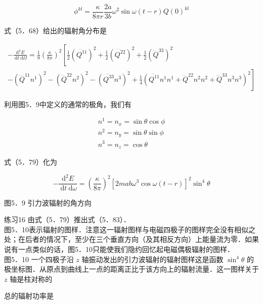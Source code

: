 \begin{equation*}
	\phi^{k l}=\frac{\kappa}{8 \pi r} \frac{2 a}{3 b} \omega^{2} \sin \omega(t-r) Q(0)^{k l} \tag{5.78}
\end{equation*}


式（5．68）给出的辐射角分布是

$$
\begin{gathered}
	-\frac{\mathrm{d}^{2} E}{\mathrm{~d} t \mathrm{~d} \Omega}=\frac{1}{9}\left(\frac{\kappa}{8 \pi}\right)^{2}\left[\frac{1}{2}\left(\dddot{Q^{11}}\right)^{2}+\frac{1}{2}\left(\dddot{Q^{22}}\right)^{2}+\frac{1}{2}\left(\dddot{Q}^{33}\right)^{2}\right. \\
	\left.-\left(\dddot{Q}^{11} n^{1}\right)^{2}-\left(\dddot{Q}^{22} n^{2}\right)^{2}-\left(\dddot{Q^{33}} n^{3}\right)^{2}+\frac{1}{4}\left(\dddot{Q^{11}} n^{1} n^{1}+\dddot{Q}^{22} n^{2} n^{2}+\dddot{Q}^{33} n^{3} n^{3}\right)^{2}\right]
\end{gathered}
$$

利用图5．9中定义的通常的极角，我们有


\begin{gather*}
	n^{1}=n_{x}=\sin \theta \cos \phi  \tag{5.80}\\
	n^{2}=n_{y}=\sin \theta \sin \phi  \tag{5.81}\\
	n^{3}=n_{z}=\cos \theta \tag{5.82}
\end{gather*}


式（5．79）化为


\begin{equation*}
	-\frac{\mathrm{d}^{2} E}{\mathrm{~d} t \mathrm{~d} \omega}=\left(\frac{\kappa}{8 \pi}\right)^{2}\left[2 m a b \omega^{3} \cos \omega(t-r)\right]^{2} \sin ^{4} \theta \tag{5.83}
\end{equation*}



图5．9 引力波辐射的角方向

练习16 由式（5．79）推出式（5．83）．\\
图5．10表示辐射的图样．注意这一辐射图样与电磁四极子的图样完全没有相似之处；在后者的情况下，至少在三个垂直方向（及其相反方向）上能量流为零．如果说有一点类似的话，图5．10只能使我们隐约回忆起电磁偶极辐射的图样．\\


图5．10 一个四极子沿 $z$ 轴振动发出的引力波辐射的辐射图样这是函数 $\sin ^{4} \theta$ 的极坐标图．从原点到曲线上一点的距离正比于该方向上的辐射流量．这一图样关于 $z$ 轴是柱对称的

总的辐射功率是


